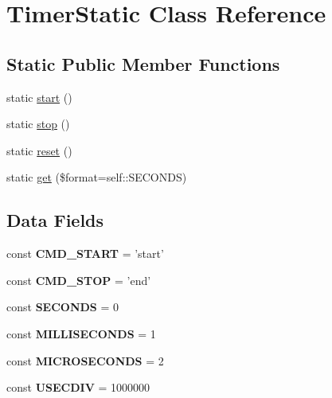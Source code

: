 \hypertarget{class_tools_1_1_timer_static}{
\section{\-Timer\-Static \-Class \-Reference}
\label{class_tools_1_1_timer_static}
}
\subsection*{\-Static \-Public \-Member \-Functions}
\begin{DoxyCompactItemize}
\item 
static \hyperlink{class_tools_1_1_timer_static_a146085d0f3a9d17bdcd7f3d4081d8c0d}{start} ()
\item 
static \hyperlink{class_tools_1_1_timer_static_a00c3c0c2fc53579e9d1ac28a52623450}{stop} ()
\item 
static \hyperlink{class_tools_1_1_timer_static_a2325df26721fdbe820d577d2482725f8}{reset} ()
\item 
static \hyperlink{class_tools_1_1_timer_static_a77dee96b30db14a683b2bc6a939a9aa6}{get} (\$format=self\-::\-S\-E\-C\-O\-N\-D\-S)
\end{DoxyCompactItemize}
\subsection*{\-Data \-Fields}
\begin{DoxyCompactItemize}
\item 
\hypertarget{class_tools_1_1_timer_static_a8bc81eb75846b0cb46a91f0c6ed5d681}{
const {\bfseries \-C\-M\-D\-\_\-\-S\-T\-A\-R\-T} = 'start'}
\label{class_tools_1_1_timer_static_a8bc81eb75846b0cb46a91f0c6ed5d681}

\item 
\hypertarget{class_tools_1_1_timer_static_a57ab24ceaa313b2a7f9b24aae00f48a2}{
const {\bfseries \-C\-M\-D\-\_\-\-S\-T\-O\-P} = 'end'}
\label{class_tools_1_1_timer_static_a57ab24ceaa313b2a7f9b24aae00f48a2}

\item 
\hypertarget{class_tools_1_1_timer_static_acb8acd67db42965b07b9994632c4a240}{
const {\bfseries \-S\-E\-C\-O\-N\-D\-S} = 0}
\label{class_tools_1_1_timer_static_acb8acd67db42965b07b9994632c4a240}

\item 
\hypertarget{class_tools_1_1_timer_static_a607b55fc52b51353979d23f14afac5fc}{
const {\bfseries \-M\-I\-L\-L\-I\-S\-E\-C\-O\-N\-D\-S} = 1}
\label{class_tools_1_1_timer_static_a607b55fc52b51353979d23f14afac5fc}

\item 
\hypertarget{class_tools_1_1_timer_static_a59cbf386974208e52f1cca5a24b8b8d8}{
const {\bfseries \-M\-I\-C\-R\-O\-S\-E\-C\-O\-N\-D\-S} = 2}
\label{class_tools_1_1_timer_static_a59cbf386974208e52f1cca5a24b8b8d8}

\item 
\hypertarget{class_tools_1_1_timer_static_a9fa5faed09e9bd8b369d7e5de082f98a}{
const {\bfseries \-U\-S\-E\-C\-D\-I\-V} = 1000000}
\label{class_tools_1_1_timer_static_a9fa5faed09e9bd8b369d7e5de082f98a}

\end{DoxyCompactItemize}



